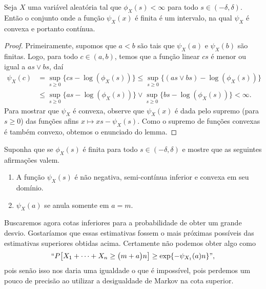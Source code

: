 \begin{lemma}
  Seja $X$ uma variável aleatória tal que $\phi_X(s) < \infty$ para todo $s \in (-\delta, \delta)$.
  Então o conjunto onde a função $\psi_X(x)$ é finita é um intervalo, na qual $\psi_X$ é convexa e portanto contínua.
\end{lemma}

\begin{proof}
  Primeiramente, supomos que $a < b$ são tais que $\psi_X(a)$ e $\psi_X(b)$ são finitas.
  Logo, para todo $c \in (a, b)$, temos que a função linear $cs$ é menor ou igual a $as \vee bs$, daí
  \begin{equation}
    \begin{split}
      \psi_X(c) &= \sup_{s \geq 0} \{cs - \log(\phi_X(s))\} \leq  \sup_{s \geq 0} \{(as \vee bs) - \log(\phi_X(s))\}\\
      & \leq \sup_{s \geq 0} \{as - \log(\phi_X(s))\} \vee \sup_{s \geq 0} \{bs - \log(\phi_X(s))\} < \infty.
    \end{split}
  \end{equation}
  Para mostrar que $\psi_X$ é convexa, observe que $\psi_X(x)$ é dada pelo supremo (para $s \geq 0$) das funções afins $x \mapsto xs - \psi_X(s)$.
  Como o supremo de funções convexas é também convexo, obtemos o enunciado do lemma.
\end{proof}


\begin{exercise}
  Suponha que se $\phi_{X}(s)$ é finita para todo $s \in (-\delta, \delta)$ e mostre que as seguintes afirmações valem.
  \begin{enumerate}[\quad a)]
  \item A função $\psi_{X}(s)$ é não negativa, semi-contínua inferior e convexa em seu domínio.
  \item $\psi_X(a)$ se anula somente em $a = m$.
  \end{enumerate}
\end{exercise}

Buscaremos agora cotas inferiores para a probabilidade de obter um grande desvio.
Gostaríamos que essas estimativas fossem o mais próximas possíveis das estimativas superiores obtidas acima.
Certamente não podemos obter algo como
\begin{equation}
  \label{e:PGDgeq_falso}
  `` P\big[ X_1 + \dots + X_n \geq \big(m + a \big) n \big] \geq \exp\{-\psi_{X_1}(a) n\} ",
\end{equation}
pois senão isso nos daria uma igualdade o que é impossível, pois perdemos um pouco de precisão ao utilizar a desigualdade de Markov na cota superior.

